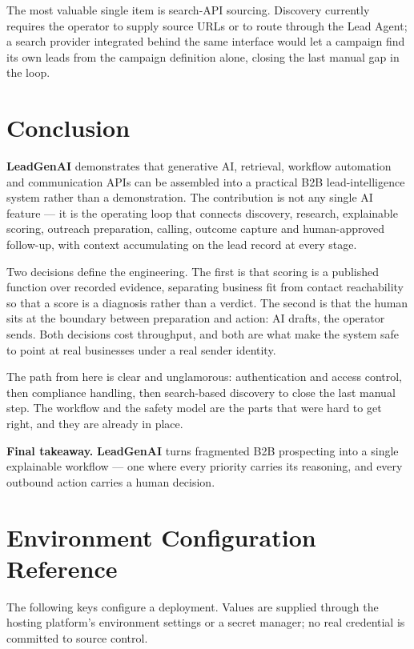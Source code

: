 \documentclass[11pt,a4paper]{report}
\newcommand{\project}{\textbf{LeadGenAI}}
\begin{document}
The most valuable single item is search-API sourcing. Discovery currently requires the operator to supply source URLs or to route through the Lead Agent; a search provider integrated behind the same interface would let a campaign find its own leads from the campaign definition alone, closing the last manual gap in the loop.

\chapter{Conclusion}
\project{} demonstrates that generative AI, retrieval, workflow automation and communication APIs can be assembled into a practical B2B lead-intelligence system rather than a demonstration. The contribution is not any single AI feature --- it is the operating loop that connects discovery, research, explainable scoring, outreach preparation, calling, outcome capture and human-approved follow-up, with context accumulating on the lead record at every stage.

Two decisions define the engineering. The first is that scoring is a published function over recorded evidence, separating business fit from contact reachability so that a score is a diagnosis rather than a verdict. The second is that the human sits at the boundary between preparation and action: AI drafts, the operator sends. Both decisions cost throughput, and both are what make the system safe to point at real businesses under a real sender identity.

The path from here is clear and unglamorous: authentication and access control, then compliance handling, then search-based discovery to close the last manual step. The workflow and the safety model are the parts that were hard to get right, and they are already in place.

\begin{successbox}
\textbf{Final takeaway.} \project{} turns fragmented B2B prospecting into a single explainable workflow --- one where every priority carries its reasoning, and every outbound action carries a human decision.
\end{successbox}

\appendix
\chapter{Environment Configuration Reference}
The following keys configure a deployment. Values are supplied through the hosting platform's environment settings or a secret manager; no real credential is committed to source control.
\end{document}
